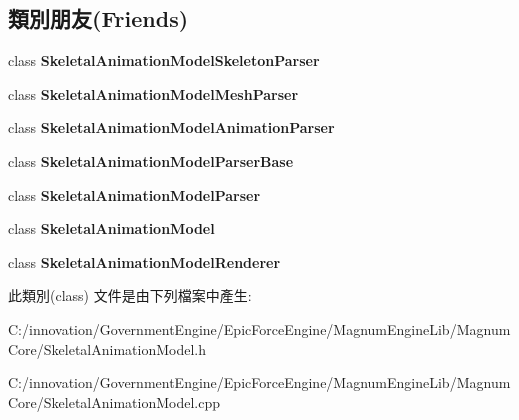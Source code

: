 \subsection*{類別朋友(Friends)}
\begin{DoxyCompactItemize}
\item 
class {\bfseries Skeletal\+Animation\+Model\+Skeleton\+Parser}\hypertarget{class_i_dream_sky_1_1_skeletal_animation_model_1_1_marker_a14bd27cfabbcaeaa0eccce0e2968a6a1}{}\label{class_i_dream_sky_1_1_skeletal_animation_model_1_1_marker_a14bd27cfabbcaeaa0eccce0e2968a6a1}

\item 
class {\bfseries Skeletal\+Animation\+Model\+Mesh\+Parser}\hypertarget{class_i_dream_sky_1_1_skeletal_animation_model_1_1_marker_a85398ce1e5e5023cd13165515f7cfbfa}{}\label{class_i_dream_sky_1_1_skeletal_animation_model_1_1_marker_a85398ce1e5e5023cd13165515f7cfbfa}

\item 
class {\bfseries Skeletal\+Animation\+Model\+Animation\+Parser}\hypertarget{class_i_dream_sky_1_1_skeletal_animation_model_1_1_marker_ade6e25226df119aaa0de3f45d908a551}{}\label{class_i_dream_sky_1_1_skeletal_animation_model_1_1_marker_ade6e25226df119aaa0de3f45d908a551}

\item 
class {\bfseries Skeletal\+Animation\+Model\+Parser\+Base}\hypertarget{class_i_dream_sky_1_1_skeletal_animation_model_1_1_marker_a11930f7450c30641e8526b073100f760}{}\label{class_i_dream_sky_1_1_skeletal_animation_model_1_1_marker_a11930f7450c30641e8526b073100f760}

\item 
class {\bfseries Skeletal\+Animation\+Model\+Parser}\hypertarget{class_i_dream_sky_1_1_skeletal_animation_model_1_1_marker_a472cd974e223ab8bf1063fc39c8a7d43}{}\label{class_i_dream_sky_1_1_skeletal_animation_model_1_1_marker_a472cd974e223ab8bf1063fc39c8a7d43}

\item 
class {\bfseries Skeletal\+Animation\+Model}\hypertarget{class_i_dream_sky_1_1_skeletal_animation_model_1_1_marker_a40c4f607e5b71602c57777a29d5b4d31}{}\label{class_i_dream_sky_1_1_skeletal_animation_model_1_1_marker_a40c4f607e5b71602c57777a29d5b4d31}

\item 
class {\bfseries Skeletal\+Animation\+Model\+Renderer}\hypertarget{class_i_dream_sky_1_1_skeletal_animation_model_1_1_marker_a9a80d2b83f1f7bd922df78f21ee526db}{}\label{class_i_dream_sky_1_1_skeletal_animation_model_1_1_marker_a9a80d2b83f1f7bd922df78f21ee526db}

\end{DoxyCompactItemize}


此類別(class) 文件是由下列檔案中產生\+:\begin{DoxyCompactItemize}
\item 
C\+:/innovation/\+Government\+Engine/\+Epic\+Force\+Engine/\+Magnum\+Engine\+Lib/\+Magnum\+Core/Skeletal\+Animation\+Model.\+h\item 
C\+:/innovation/\+Government\+Engine/\+Epic\+Force\+Engine/\+Magnum\+Engine\+Lib/\+Magnum\+Core/Skeletal\+Animation\+Model.\+cpp\end{DoxyCompactItemize}
